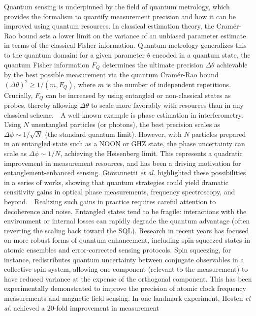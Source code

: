 \documentclass[12pt]{article}
\begin{document}
Quantum sensing is underpinned by the field of quantum metrology,
which provides the formalism to quantify measurement precision and how
it can be improved using quantum resources. In classical estimation
theory, the Cramér-Rao bound sets a lower limit on the variance of an
unbiased parameter estimate in terms of the classical Fisher
information. Quantum metrology generalizes this to the quantum domain:
for a given parameter $\theta$ encoded in a quantum state, the quantum
Fisher information $F_Q$ determines the ultimate precision $\Delta
\theta$ achievable by the best possible measurement via the quantum
Cramér-Rao bound $(\Delta \theta)^2 \ge 1/(m, F_Q)$, where $m$ is the
number of independent repetitions\cite{Braunstein1994}. Crucially,
$F_Q$ can be increased by using entangled or non-classical states as
probes, thereby allowing $\Delta \theta$ to scale more favorably with
resources than in any classical scheme.    A well-known example is
phase estimation in interferometry. Using $N$ unentangled particles
(or photons), the best precision scales as $\Delta \phi \sim
1/\sqrt{N}$ (the standard quantum limit). However, with $N$ particles
prepared in an entangled state such as a NOON or GHZ state, the phase
uncertainty can scale as $\Delta \phi \sim 1/N$, achieving the
Heisenberg limit. This represents a quadratic improvement in
measurement resources, and has been a driving motivation for
entanglement-enhanced sensing. Giovannetti \textit{et al.} highlighted
these possibilities in a series of works, showing that quantum
strategies could yield dramatic sensitivity gains in optical phase
measurements, frequency spectroscopy, and
beyond\cite{Giovannetti2011}.    Realizing such gains in practice
requires careful attention to decoherence and noise. Entangled states
tend to be fragile: interactions with the environment or internal
losses can rapidly degrade the quantum advantage (often reverting the
scaling back toward the SQL). Research in recent years has focused on
more robust forms of quantum enhancement, including spin-squeezed
states in atomic ensembles and error-corrected sensing protocols. Spin
squeezing, for instance, redistributes quantum uncertainty between
conjugate observables in a collective spin system, allowing one
component (relevant to the measurement) to have reduced variance at
the expense of the orthogonal component. This has been experimentally
demonstrated to improve the precision of atomic clock frequency
measurements and magnetic field sensing. In one landmark experiment,
Hosten \textit{et al.} achieved a 20-fold improvement in measurement
\end{document}
